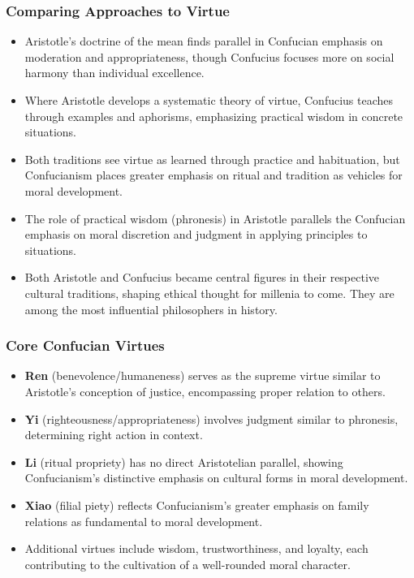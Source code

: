 \documentclass{beamer}
\begin{document}
\begin{frame}
    \frametitle{Comparing Approaches to Virtue}
    \begin{itemize}
        \item Aristotle's doctrine of the mean finds parallel in Confucian emphasis on moderation and appropriateness, though Confucius focuses more on social harmony than individual excellence.
        
        \item Where Aristotle develops a systematic theory of virtue, Confucius teaches through examples and aphorisms, emphasizing practical wisdom in concrete situations.
        
        \item Both traditions see virtue as learned through practice and habituation, but Confucianism places greater emphasis on ritual and tradition as vehicles for moral development.
        
        \item The role of practical wisdom (phronesis) in Aristotle parallels the Confucian emphasis on moral discretion and judgment in applying principles to situations.
        
        \item Both Aristotle and Confucius became central figures in their respective cultural traditions, shaping ethical thought for millenia to come. They are among the most influential philosophers in history.
    \end{itemize}
\end{frame}

\begin{frame}
    \frametitle{Core Confucian Virtues}
    \begin{itemize}
        \item \textbf{Ren} (benevolence/humaneness) serves as the supreme virtue similar to Aristotle's conception of justice, encompassing proper relation to others.
        
        \item \textbf{Yi} (righteousness/appropriateness) involves judgment similar to phronesis, determining right action in context.
        
        \item \textbf{Li} (ritual propriety) has no direct Aristotelian parallel, showing Confucianism's distinctive emphasis on cultural forms in moral development.
        
        \item \textbf{Xiao} (filial piety) reflects Confucianism's greater emphasis on family relations as fundamental to moral development.
        
        \item Additional virtues include wisdom, trustworthiness, and loyalty, each contributing to the cultivation of a well-rounded moral character.
    \end{itemize}
\end{frame}
\end{document}

